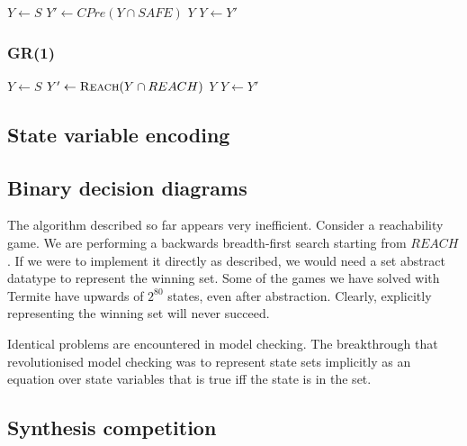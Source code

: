 \documentclass{article}
\newcommand{\buchi}{Buchi }
\begin{document}
\begin{algorithm}[t]
\begin{algorithmic}
\State $Y \gets S$
\Loop
\State $Y' \gets CPre(Y \cap SAFE)$
\State\Return $Y$\EndIf
\State $Y \gets Y'$
\EndLoop
\EndFunction
\end{algorithmic}
\caption{Solving a safety game}
\label{a:safe}
\end{algorithm}

\subsubsection{GR(1)}

\begin{algorithm}[t]
\begin{algorithmic}
\State $Y \gets S$
\Loop
\State $Y' \gets \Call{Reach}{Y \cap REACH}$
\State\Return $Y$\EndIf
\State $Y \gets Y'$
\EndLoop
\EndFunction
\end{algorithmic}
\caption{Solving a \buchi game}
\label{a:buchi}
\end{algorithm}

\subsection{State variable encoding}

\subsection{Binary decision diagrams}

The algorithm described so far appears very inefficient. Consider a reachability game. We are performing a backwards breadth-first search starting from $REACH$. If we were to implement it directly as described, we would need a set abstract datatype to represent the winning set. Some of the games we have solved with Termite have upwards of $2^80$ states, even after abstraction. Clearly, explicitly representing the winning set will never succeed. 

Identical problems are encountered in model checking. The breakthrough that revolutionised model checking was to represent state sets implicitly as an equation over state variables that is true iff the state is in the set. 

\subsection{Synthesis competition}
\end{document}
